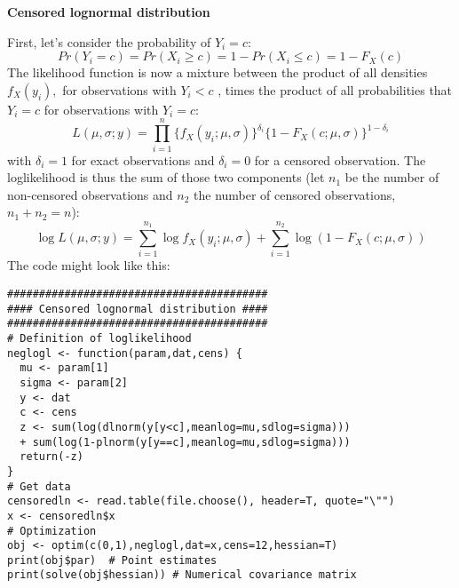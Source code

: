 \begin{Solution}{12.3}
\textbf{Censored lognormal distribution}

First, let's consider the probability of $Y_i=c$:
\begin{equation*}
  Pr(Y_i = c) = Pr(X_i \geq c) = 1 - Pr(X_i \leq c) = 1- F_X(c)
\end{equation*}
The likelihood function is now a mixture between the product of all densities $f_{X}(y_{i}),$ for observations with $Y_{i}<c$%
, times the product of all probabilities that $Y_{i}=c$ for observations with
$Y_{i}=c$:
\begin{equation*}
L(\mu,\sigma; y) = \prod_{i=1}^n\{ f_X(y_i;\mu,\sigma)\}^{\delta_i}\{1-F_X(c;\mu,\sigma)\}^{1-\delta_i}
\end{equation*}
with $\delta_i=1$ for exact observations and $\delta_i=0$ for a censored
observation. The loglikelihood is thus the sum of those two components (let
$n_1$ be the number of non-censored observations and $n_2$ the number of
censored observations, $n_1+n_2=n$):
\begin{equation*}
\log L(\mu,\sigma; y) = \sum_{i=1}^{n_1} \log f_X(y_i;\mu,\sigma) +
\sum_{i=1}^{n_2} \log(1-F_X(c;\mu,\sigma))
\end{equation*}
The code might look like this:
\begin{verbatim}
#########################################
#### Censored lognormal distribution ####
#########################################
# Definition of loglikelihood
neglogl <- function(param,dat,cens) {
  mu <- param[1]
  sigma <- param[2]
  y <- dat
  c <- cens
  z <- sum(log(dlnorm(y[y<c],meanlog=mu,sdlog=sigma)))
  + sum(log(1-plnorm(y[y==c],meanlog=mu,sdlog=sigma)))
  return(-z)
}
# Get data
censoredln <- read.table(file.choose(), header=T, quote="\"")
x <- censoredln$x
# Optimization
obj <- optim(c(0,1),neglogl,dat=x,cens=12,hessian=T)
print(obj$par)  # Point estimates
print(solve(obj$hessian)) # Numerical covariance matrix
\end{verbatim}
\end{Solution}
